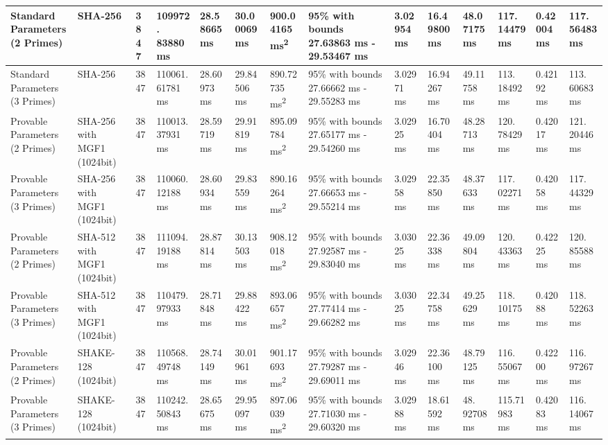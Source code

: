 \documentclass[]{final_report}
\theoremstyle{definition}
\begin{document}
\begin{landscape}
\begin{longtable}{|p{2.3cm}|p{1.8cm}|p{1.0cm}|p{1.7cm}|p{1.4cm}|p{1.5cm}|p{1.8cm}|p{1.5cm}|p{1.2cm}|p{1.5cm}|p{1.3cm}|p{1.2cm}|p{1.3cm}|p{1.3cm}|}
\hline
\endlastfoot
Standard Parameters (2 Primes) & SHA-256 & 3847 & 109972.
83880 ms & 28.58665 ms & 30.00069 ms & 900.04165 ms\textsuperscript{2} & 95\% with bounds 27.63863 ms - 29.53467 ms & 3.02954 ms & 16.49800 ms & 48.07175 ms & 117.
14479 ms & 0.42004 ms & 117.
56483 ms  \\
\hline
Standard Parameters (3 Primes) & SHA-256 & 3847 & 110061.
61781 ms & 28.60973 ms & 29.84506 ms & 890.72735 ms\textsuperscript{2} & 95\% with bounds 27.66662 ms - 29.55283 ms & 3.02971 ms & 16.94267 ms & 49.11758 ms & 113.
18492 ms & 0.42192 ms & 113.
60683 ms  \\
\hline
Provable Parameters (2 Primes) & SHA-256 with MGF1 (1024bit) & 3847 & 110013.
37931 ms & 28.59719 ms & 29.91819 ms & 895.09784 ms\textsuperscript{2} & 95\% with bounds 27.65177 ms - 29.54260 ms & 3.02925 ms & 16.70404 ms & 48.28713 ms & 120.
78429 ms & 0.42017 ms & 121.
20446 ms  \\
\hline
Provable Parameters (3 Primes) & SHA-256 with MGF1 (1024bit) & 3847 & 110060.12188 ms & 28.60934 ms & 29.83559 ms & 890.16264 ms\textsuperscript{2} & 95\% with bounds 27.66653 ms - 29.55214 ms & 3.02958 ms & 22.35850 ms & 48.37633 ms & 117.
02271 ms & 0.42058 ms & 117.
44329 ms  \\
\hline
Provable Parameters (2 Primes) & SHA-512 with MGF1 (1024bit) & 3847 & 111094.
19188 ms & 28.87814 ms & 30.13503 ms & 908.12018 ms\textsuperscript{2} & 95\% with bounds 27.92587 ms - 29.83040 ms & 3.03025 ms & 22.36338 ms & 49.09804 ms & 120.
43363 ms & 0.42225 ms & 120.
85588 ms  \\
\hline
Provable Parameters (3 Primes) & SHA-512 with MGF1 (1024bit) & 3847 & 110479.
97933 ms & 28.71848 ms & 29.88422 ms & 893.06657 ms\textsuperscript{2} & 95\% with bounds 27.77414 ms - 29.66282 ms & 3.03025 ms & 22.34758 ms & 49.25629 ms & 118.
10175 ms & 0.42088 ms & 118.
52263 ms  \\
\hline
Provable Parameters (2 Primes) & SHAKE-128 (1024bit) & 3847 & 110568.
49748 ms & 28.74149 ms & 30.01961 ms & 901.17693 ms\textsuperscript{2} & 95\% with bounds 27.79287 ms - 29.69011 ms & 3.02946 ms & 22.36100 ms & 48.79125 ms & 116.
55067 ms & 0.42200 ms & 116.
97267 ms  \\
\hline
Provable Parameters (3 Primes) & SHAKE-128 (1024bit) & 3847 & 110242.
50843 ms & 28.65675 ms & 29.95097 ms & 897.06039 ms\textsuperscript{2} & 95\% with bounds 27.71030 ms - 29.60320 ms & 3.02988 ms & 18.61592 ms & 48.
92708 ms & 115.71983 ms & 0.42083 ms & 116.
14067 ms \\

\end{longtable}
\end{landscape}
\end{document}
